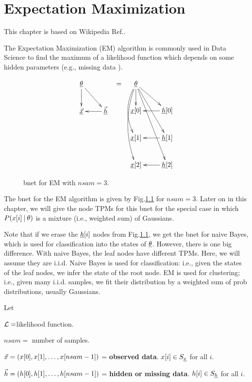 \chapter{Expectation Maximization}

This chapter is based on Wikipedia 
Ref.\cite{wiki-em}.

The Expectation Maximization (EM) 
algorithm 
is commonly used in Data Science 
to find the maximum of a
 likelihood function which 
depends on some hidden parameters
 (e.g., missing data ). 

\begin{figure}[h!]
\centering
$$\begin{array}{ccc}
\xymatrix{
\ul{\theta}\ar[d]\ar[dr]
\\
\ul{\vecx}&\ul{\vech}\ar[l]
}
&=&
\xymatrix{
\ul{\theta}
\ar[d]
\ar@/_1pc/[dd]
\ar@/_1pc/[ddd]
\ar[rd]\ar[rdd]\ar[rddd]
\\
\rvx[0]
&\rvh[0]\ar[l]
\\
\rvx[1]
&\rvh[1]\ar[l]
\\
\rvx[2]
&\rvh[2]\ar[l]
}
\end{array}
$$
\caption{bnet for EM with $nsam=3$.}
\label{fig-em-bnet}
\end{figure}


The bnet for the EM algorithm
is given by Fig.\ref{fig-em-bnet}
for $nsam=3$.
Later on in this chapter,
we will give the node TPMs
for this bnet for
the special
case in which $P(x[i]{\:\mathbf{|}\:} \theta)$
is a mixture (i.e., weighted sum)
of Gaussians.

Note that if we 
erase the ${\underline{h}}[i]$ nodes
from Fig.\ref{fig-em-bnet},
we get the bnet for naive Bayes,
which is used for classification
into the states of $\underline{\theta}$.
However, there is one big
difference. 
With naive Bayes,
the leaf nodes have
different TPMs.
Here, we will assume they are i.i.d.
Naive Bayes is used for classification: i.e., 
given the states 
of the leaf nodes,
we infer the state of the root node.
EM is used for clustering; i.e.,
given many i.i.d. samples,
we fit their distribution by a weighted sum
of prob distributions,
usually Gaussians.

Let
 
${\cal L}=$likelihood 
function.

$nsam=$ number of samples.

${\vec{x}}=(x[0], x[1], \ldots, x[nsam-1])$ =
{\bf observed data}.
 $x[i]\in S_{\underline{x}}$ for all $i$.

${\vec{h}}=(h[0], h[1], \ldots, h[nsam-1])$
= {\bf hidden or missing data}.
$h[i]\in S_{\underline{h}}$ for all $i$.

